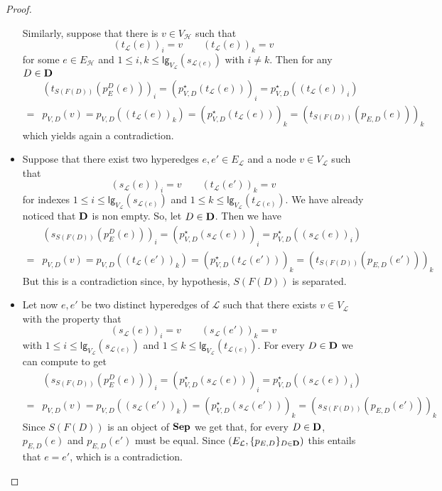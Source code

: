 \documentclass[3p]{elsarticle}
\newcommand{\lgh}{\mathsf{lg}}
\def\D{\textbf {\textup{D}}}
\newcommand{\catname}[1]{\textbf{\textup{#1}}}
\newcommand{\shyp}{\catname{Sep}}
\theoremstyle{remark}
\theoremstyle{definition}
\begin{document}
\begin{proof}
\begin{itemize}
		Similarly, suppose that there is $v\in V_{\mathcal{H}}$ such that
			\[(t_{\mathcal{L}}(e))_i=v \qquad  (t_{\mathcal{L}}(e) )_k= v\]
			for some $e\in E_{\mathcal{H}}$ and $1\leq i, k \leq \lgh_{V_{\mathcal{L}}}(s_{\mathcal{L}(e)})$ with $i\neq k$. Then for any $D\in \D$
			\begin{align*}
				&(t_{S(F(D))}( p^D_{E}(e)))_i = ( p^\star_{V,D}(t_{\mathcal{L}}(e)))_i=p^\star_{V, D}((t_{\mathcal{L}}(e))_i)\\=&p_{V,D}(v)=p_{V, D}((t_{\mathcal{L}}(e))_k)=(p^\star_{V,D}(t_{\mathcal{L}}(e)))_k=(t_{S(F(D))}( p_{E,D}(e)))_k  	
			\end{align*}
			which yields again a contradiction.
		\item Suppose that there exist two hyperedges $e, e'\in E_{\mathcal{L}}$ and  a node $v\in V_{\mathcal{L}}$ such that \[(s_{\mathcal{L}}(e))_i=v \qquad  (t_{\mathcal{L}}(e') )_k= v\]
		for indexes $1\leq i \leq \lgh_{V_{\mathcal{L}}}(s_{\mathcal{L}(e)})$ and $1\leq k \leq \lgh_{V_{\mathcal{L}}}(t_{\mathcal{L}(e)}) $. We have already noticed that $\D$ is non empty. So, let $D\in \D$. Then we have
		\begin{align*}&(s_{S(F(D))}( p^D_{E}(e)))_i = ( p^\star_{V,D}(s_{\mathcal{L}}(e)))_i=p^\star_{V, D}((s_{\mathcal{L}}(e))_i)\\=&p_{V,D}(v)=p_{V, D}((t_{\mathcal{L}}(e'))_k)=(p^\star_{V,D}(t_{\mathcal{L}}(e')))_k=(t_{S(F(D))}( p_{E,D}(e')))_k  	
		\end{align*}
		But this is a contradiction since, by hypothesis, $S(F(D))$ is separated. 
		\item Let now $e, e'$ be two distinct hyperedges of $\mathcal{L}$ such that there exists $v\in V_{\mathcal{L}}$ with the property that 
		 \[(s_{\mathcal{L}}(e))_i=v \qquad  (s_{\mathcal{L}}(e') )_k= v\]
		with $1\leq i \leq \lgh_{V_{\mathcal{L}}}(s_{\mathcal{L}(e)})$ and $1\leq k \leq \lgh_{V_{\mathcal{L}}}(t_{\mathcal{L}(e)}) $. For every $D\in \D$ we can compute to get
		\begin{align*}&(s_{S(F(D))}( p^D_{E}(e)))_i = ( p^\star_{V,D}(s_{\mathcal{L}}(e)))_i=p^\star_{V, D}((s_{\mathcal{L}}(e))_i)\\=&p_{V,D}(v)=p_{V, D}((s_{\mathcal{L}}(e'))_k)=(p^\star_{V,D}(s_{\mathcal{L}}(e')))_k=(s_{S(F(D))}( p_{E,D}(e')))_k  	
		\end{align*}
		Since $S(F(D))$ is an object of $\shyp$ we get that, for every $D\in \D$,  $p_{E,D}(e)$ and $p_{E,D}(e')$ must be equal.  Since $(E_\mathcal{L}, \{p_{E, D}\}_{D\in \D})$ this entails that $e = e'$, which is a contradiction.

\end{itemize}
\end{proof}
\end{document}
